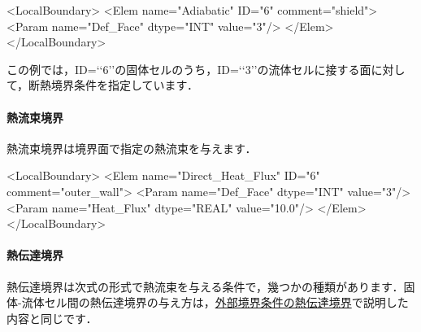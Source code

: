 {\small
\begin{program}
<LocalBoundary>
  <Elem name="Adiabatic" ID="6" comment="shield">
    <Param name="Def_Face" dtype="INT" value="3"/>
  </Elem>
</LocalBoundary>
\end{program}
}
この例では，ID=\lq\lq 6\rq\rq の固体セルのうち，ID=\lq\lq 3\rq\rq の流体セルに接する面に対して，断熱境界条件を指定しています．

%
\paragraph{熱流束境界}
熱流束境界は境界面で指定の熱流束を与えます．

{\small
\begin{program}
<LocalBoundary>
  <Elem name="Direct_Heat_Flux" ID="6" comment="outer_wall">
    <Param name="Def_Face"    dtype="INT"    value="3"/>
    <Param name="Heat_Flux"   dtype="REAL"   value="10.0"/>
  </Elem>
</LocalBoundary>
\end{program}
}

%
\paragraph{熱伝達境界}
熱伝達境界は次式の形式で熱流束を与える条件で，幾つかの種類があります．固体-流体セル間の熱伝達境界の与え方は，\hyperlink{tgt:heat-transfer}{外部境界条件の熱伝達境界}で説明した内容と同じです．

